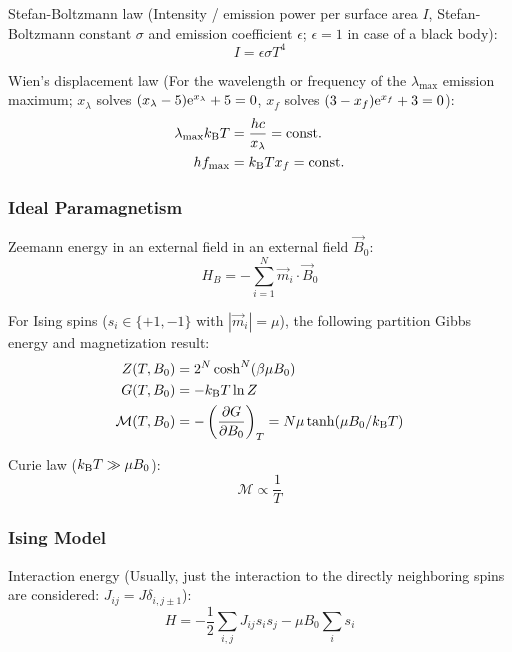			\noindent
			Stefan-Boltzmann law (Intensity / emission power per surface area $I$, Stefan-Boltzmann constant $\sigma$ and emission coefficient $\epsilon$; $\epsilon=1$ in case of a black body):
			\begin{equation}
				I = \epsilon\sigma T^4
			\end{equation}

			\noindent
			Wien's displacement law (For the wavelength or frequency of the $\lambda_{\max}$ emission maximum; $x_\lambda$ solves $(x_\lambda-5)\mathrm{e}^{x_\lambda}+5=0$, $x_f$ solves $(3-x_f)\mathrm{e}^{x_f}+3=0$):
			\begin{equation}
				\begin{aligned}
					\lambda_{\max} k_{\text{B}} T &= \frac{h c}{x_\lambda} = \mathrm{const.} \\
					h f_{\max} &= k_{\text{B}} T x_f = \mathrm{const.} \\
				\end{aligned}
			\end{equation}

		\subsubsection{Ideal Paramagnetism}
			\noindent
			Zeemann energy in an external field in an external field $\vec{B}_0$:
			\begin{equation}
				H_B = -\sum_{i=1}^N \vec{m}_i \cdot \vec{B}_0
			\end{equation}

			\noindent
			For Ising spins ($s_i\in\lbrace +1, -1\rbrace$ with $|\vec{m}_i| = \mu$), the following partition Gibbs energy and magnetization result:
			\begin{equation}
				\begin{aligned}
					Z(T,B_0) &= 2^N \cosh^N (\beta\mu B_0) \\
					G(T,B_0) &= -k_{\text{B}} T \ln Z \\
					\mathcal{M}(T,B_0) &= -\left(\pdv{G}{B_0}\right)_T = N\mu \tanh(\mu B_0 /k_{\text{B}} T)
				\end{aligned}
			\end{equation}

			\noindent
			Curie law ($k_{\text{B}} T \gg \mu B_0$):
			\begin{equation}
				\mathcal{M} \propto \frac{1}{T}
			\end{equation}

		\subsubsection{Ising Model}
			\noindent
			Interaction energy (Usually, just the interaction to the directly neighboring spins are considered: $J_{ij} = J \delta_{i,j\pm 1}$):
			\begin{equation}
				H = -\frac{1}{2}\sum_{i,j} J_{ij} s_i s_j -\mu B_0 \sum_i s_i
			\end{equation}

